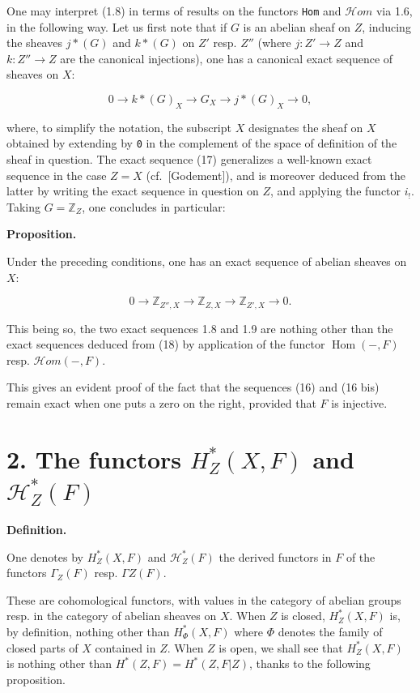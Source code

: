 \documentclass[
  11pt,
  a4paper,
]{book}
\begin{document}
One may interpret (1.8) in terms of results on the functors \texttt{Hom}
and \(\mathcal{H}om\) via 1.6, in the following way. Let us first note
that if \(G\) is an abelian sheaf on \(Z\), inducing the sheaves
\(j*(G)\) and \(k*(G)\) on \(Z'\) resp. \(Z''\) (where \(j: Z' \to Z\)
and \(k: Z'' \to Z\) are the canonical injections), one has a canonical
exact sequence of sheaves on \(X\):

\[ 0 \longrightarrow k*(G)_{X} \longrightarrow G_{X} \longrightarrow j*(G)_{X} \longrightarrow 0, \]

where, to simplify the notation, the subscript \(X\) designates the
sheaf on \(X\) obtained by extending by \texttt{0} in the complement of
the space of definition of the sheaf in question. The exact sequence
(17) generalizes a well-known exact sequence in the case \(Z = X\)
(cf.~{[}Godement{]}), and is moreover deduced from the latter by writing
the exact sequence in question on \(Z\), and applying the functor
\(i_{!}\). Taking \(G = \mathbb{Z}_{Z}\), one concludes in particular:

\textbf{Proposition.}

Under the preceding conditions, one has an exact sequence of abelian
sheaves on \(X\):

\[ 0 \longrightarrow \mathbb{Z}_{Z'',X} \longrightarrow \mathbb{Z}_{Z,X} \longrightarrow \mathbb{Z}_{Z',X}
\longrightarrow 0. \]

This being so, the two exact sequences 1.8 and 1.9 are nothing other
than the exact sequences deduced from (18) by application of the functor
\(\operatorname{Hom}(-, F)\) resp. \(\mathcal{H}om(-, F)\).

This gives an evident proof of the fact that the sequences (16) and (16
bis) remain exact when one puts a zero on the right, provided that \(F\)
is injective.

\section{\texorpdfstring{2. The functors \(H^{*}_{Z}(X, F)\) and
\(\mathcal{H}^{*}_{Z}(F)\)}{2. The functors H\^{}\{*\}\_\{Z\}(X, F) and \textbackslash mathcal\{H\}\^{}\{*\}\_\{Z\}(F)}}\label{the-functors-h_zx-f-and-mathcalh_zf}

\textbf{Definition.}

One denotes by \(H^{*}_{Z}(X, F)\) and \(\mathcal{H}^{*}_{Z}(F)\) the
derived functors in \(F\) of the functors \(\Gamma_{Z}(F)\) resp.
\(\Gamma Z(F)\).

These are cohomological functors, with values in the category of abelian
groups resp. in the category of abelian sheaves on \(X\). When \(Z\) is
closed, \(H^{*}_{Z}(X, F)\) is, by definition, nothing other than
\(H^{*}_{\Phi}(X, F)\) where \(\Phi\) denotes the family of closed parts
of \(X\) contained in \(Z\). When \(Z\) is open, we shall see that
\(H^{*}_{Z}(X, F)\) is nothing other than
\(H^{*}(Z, F) = H^{*}(Z, F|Z)\), thanks to the following proposition.
\end{document}
